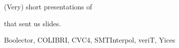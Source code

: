 \documentclass{beamer}
\begin{document}
 















\logo{}


\begin{frame}{}
(Very) short presentations of

  \begin{center}
    \vfill
    
      {\huge {}}
      
    \vfill
  \end{center}
      that sent us slides.

    \vfill
\begin{center}
Boolector, COLIBRI, CVC4, SMTInterpol, veriT, Yices
\end{center}

\end{frame}

{
  
  
  
  
  
  
}
\end{document}
